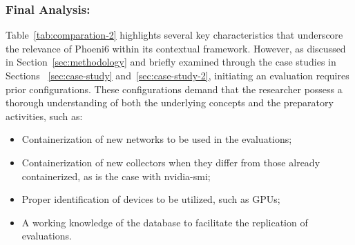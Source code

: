 \subsubsection{Final Analysis:} 

Table~\ref{tab:comparation-2} highlights several key characteristics that underscore the relevance of Phoeni6 within its contextual framework. However, as discussed in Section~\ref{sec:methodology} and briefly examined through the case studies in Sections ~\ref{sec:case-study} and~\ref{sec:case-study-2}, initiating an evaluation requires prior configurations. These configurations demand that the researcher possess a thorough understanding of both the underlying concepts and the preparatory activities, such as:

\begin{itemize}
    \item Containerization of new networks to be used in the evaluations;
    \item Containerization of new collectors when they differ from those already containerized, as is the case with nvidia-smi;
    \item Proper identification of devices to be utilized, such as GPUs;
    \item A working knowledge of the database to facilitate the replication of evaluations.
\end{itemize}